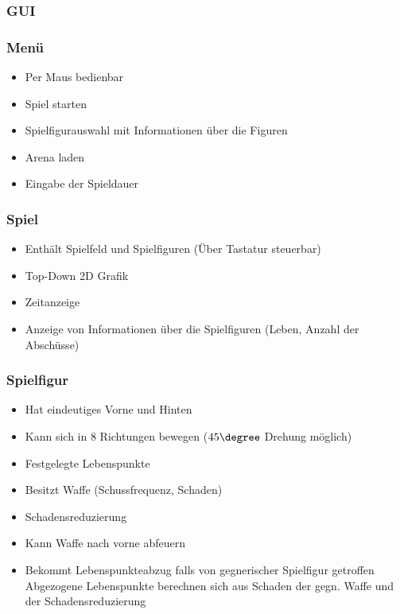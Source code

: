\subsubsection{GUI}
\subsubsection*{Menü}
\begin{itemize}
\item Per Maus bedienbar
\item Spiel starten
\item Spielfigurauswahl mit Informationen über die Figuren
\item Arena laden 
\item Eingabe der Spieldauer
\end{itemize}

\subsubsection*{Spiel}
\begin{itemize}
\item Enthält Spielfeld und Spielfiguren (Über Tastatur steuerbar)
\item Top-Down 2D Grafik
\item Zeitanzeige
\item Anzeige von Informationen über die Spielfiguren (Leben, Anzahl der Abschüsse)
\end{itemize}


\subsubsection{Spielfigur}
\begin{itemize}
\item Hat eindeutiges Vorne und Hinten
\item Kann sich in 8 Richtungen bewegen ($45\degree$ Drehung möglich)
\item Festgelegte Lebenspunkte
\item Besitzt Waffe (Schussfrequenz, Schaden)
\item Schadensreduzierung
\item Kann Waffe nach vorne abfeuern
\item Bekommt Lebenspunkteabzug falls von gegnerischer Spielfigur getroffen 
\newline Abgezogene Lebenspunkte berechnen sich aus Schaden der gegn. Waffe und der Schadensreduzierung 
\end{itemize}


